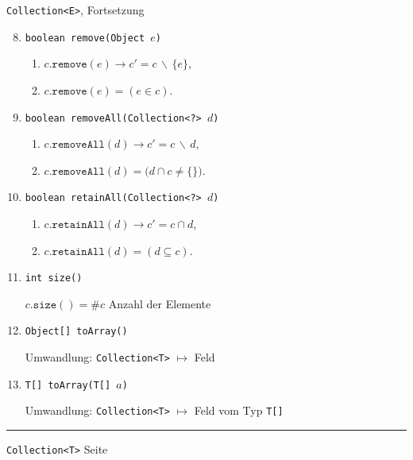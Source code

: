 \documentclass{slides}
\newcounter{mypage}
\begin{document}


\begin{slide}{}
\normalsize

\begin{center}
\texttt{Collection<E>}, Fortsetzung
\end{center}
\vspace*{0.5cm}

\footnotesize
\begin{enumerate}
\setcounter{enumi}{7}
\item \texttt{boolean remove(Object $e$)}

      \begin{enumerate}
      \item $c.\mathtt{remove}(e) \rightarrow c' = c \,\backslash\, \{ e \}$,
      \item $c.\mathtt{remove}(e) = (e \in c)$.
      \end{enumerate}
\item \texttt{boolean removeAll(Collection<?> $d$)}

      \begin{enumerate}
      \item $c.\mathtt{removeAll}(d) \rightarrow c' = c \,\backslash\, d$,
      \item $c.\mathtt{removeAll}(d) = \bigl(d \cap c \not= \{\}\bigr)$.
      \end{enumerate}
\item \texttt{boolean retainAll(Collection<?> $d$)}

      \begin{enumerate}
      \item $c.\mathtt{retainAll}(d) \rightarrow c' = c \cap d$,
      \item $c.\mathtt{retainAll}(d) = (d \subseteq c)$.
      \end{enumerate}
\item \texttt{int size()}

      $c.\mathtt{size}() = \# c$ \quad Anzahl der Elemente
\item \texttt{Object[] toArray()}
  
      Umwandlung: \texttt{Collection<T>} $\mapsto$ Feld 
\item \texttt{T[] toArray(T[] $a$)}

      Umwandlung: \texttt{Collection<T>} $\mapsto$ Feld vom Typ \texttt{T[]}

\end{enumerate}

\vspace*{\fill}
\tiny \addtocounter{mypage}{1}
\rule{17cm}{1mm}
\texttt{Collection<T>} \hspace*{\fill} Seite 
\end{slide}
\end{document}
